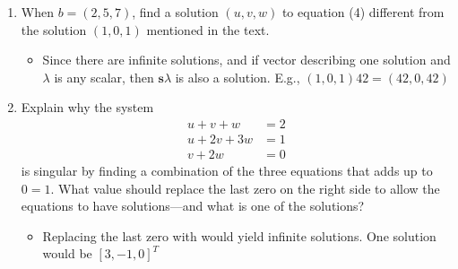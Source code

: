 \begin{itemize}
\begin{enumerate}
    \item When \( b = (2,5,7) \), find a solution \( (u,v,w) \) to equation (4)
      different from the solution \( (1,0,1) \) mentioned in the text.
      \begin{itemize}\color{foreground}
        \item Since there are infinite solutions, and if  vector
          describing one solution and \( \lambda \) is any scalar, then \(
          \bm{s} \lambda \) is also a solution. E.g., \( \left( 1,0,1 \right)
          42 = \left( 42,0,42 \right)  \)
      \end{itemize}
      \vspace{30pt}
      \addtocounter{enumi}{1}
      \item Explain why the system
      \begin{align*}
        u + v + w &= 2 \\
        u + 2v + 3w &= 1 \\
        v + 2w &= 0
      \end{align*}
      is singular by finding a combination of the three equations that adds up
      to \(0 = 1\). What value should replace the last zero on the right side to
      allow the equations to have solutions---and what is one of the solutions?
      \begin{itemize}\color{foreground}
        \item Replacing the last zero with  would yield infinite
          solutions. One solution would be \( \left[ 3,-1,0 \right]^T \)
      \end{itemize}


\end{enumerate}
\end{itemize}
